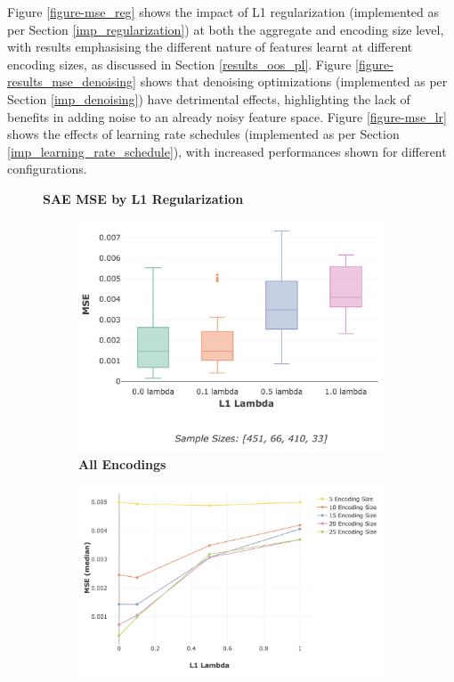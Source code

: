 \documentclass[a4paper,11pt,oneside]{article}
\theoremstyle{plain}
\theoremstyle{definition}
\begin{document}
	Figure \ref{figure-mse_reg} shows the impact of L1 regularization (implemented as per Section \ref{imp_regularization}) at both the aggregate and encoding size level, with results emphasising the different nature of features learnt at different encoding sizes, as discussed in Section \ref{results_oos_pl}. Figure \ref{figure-results_mse_denoising} shows that denoising optimizations (implemented as per Section \ref{imp_denoising}) have detrimental effects, highlighting the lack of benefits in adding noise to an already noisy feature space. Figure \ref{figure-mse_lr} shows the effects of learning rate schedules (implemented as per Section \ref{imp_learning_rate_schedule}), with increased performances shown for different configurations.
	
	\begin{figure}[H]
	\centering
	\textbf{SAE MSE by L1 Regularization}
	\begin{subfigure}{.49\textwidth}
		\centering 
		\includegraphics[scale=0.3]{images/results/network/reg/actual_mse_reg.png}
		\caption{\textbf{All Encodings} 
			\newline }
		\label{figure-actual_mse_reg}
	\end{subfigure}%
	\begin{subfigure}{.49\textwidth}
		\centering 
		\includegraphics[scale=0.3]{images/results/network/reg/actual_sae_mse_by_encoding.png}

\end{subfigure}
\end{figure}
\end{document}
